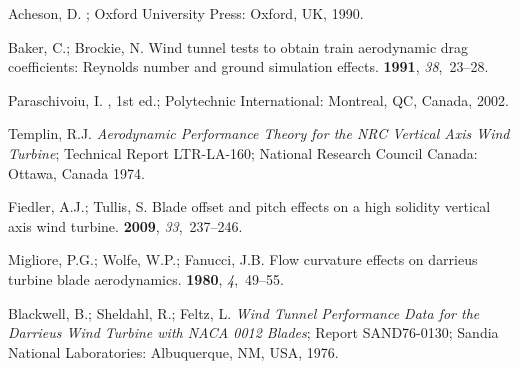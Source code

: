\documentclass[energies,article,accept,moreauthors,pdftex,10pt,a4paper]{mdpi}
\theoremstyle{mdpi}
\newcounter{ex}
\newcounter{re}
\begin{document}



\renewcommand\bibname{References}
%
%
%
%

\begin{thebibliography}{999}
\providecommand{\natexlab}[1]{#1}

 Acheson, D. ; Oxford University Press: Oxford, UK, 1990.

 Baker, C.; Brockie, N. \newblock
Wind tunnel tests to obtain train aerodynamic drag coefficients: {R}eynolds
number and ground simulation effects. 
{\bf 1991}, {\em 38},~23--28.

 Paraschivoiu, I. , 1st ed.; Polytechnic
International: Montreal, QC, Canada, 2002.

 Templin, R.J. \newblock \emph{Aerodynamic
    Performance Theory for the NRC Vertical Axis Wind Turbine}; \newblock Technical
Report LTR-LA-160; National Research Council Canada: Ottawa, Canada 1974.

 Fiedler, A.J.; Tullis, S.
\newblock Blade offset and pitch effects on a high solidity vertical axis wind
turbine.  {\bf 2009}, {\em 33},~237--246.

Migliore, P.G.; Wolfe, W.P.; Fanucci, J.B. \newblock Flow curvature effects on
{d}arrieus turbine blade aerodynamics.  {\bf 1980},
{\em 4},~49--55.

 Blackwell, B.; Sheldahl, R.; Feltz, L. \newblock
\emph{Wind Tunnel Performance Data for the {Darrieus} Wind Turbine with {NACA}
    0012 Blades}; \newblock Report SAND76-0130; Sandia National Laboratories:
Albuquerque, NM, USA, 1976.


\end{thebibliography}
\end{document}
